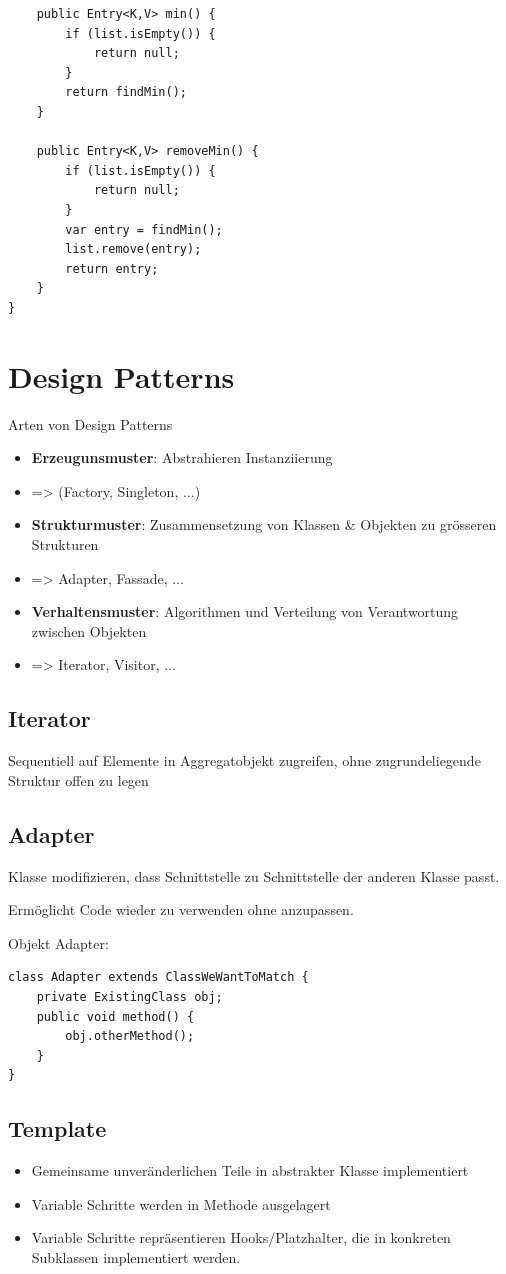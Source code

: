 \begin{multicols*}{4}
	
	\columnbreak
	
	\begin{lstlisting}
	public Entry<K,V> min() {
		if (list.isEmpty()) {
			return null;
		}
		return findMin();
	}

	public Entry<K,V> removeMin() {
		if (list.isEmpty()) {
			return null;
		}
		var entry = findMin();
		list.remove(entry);
		return entry;
	}
}
	\end{lstlisting}

\section{Design Patterns}
	Arten von Design Patterns
	\begin{itemize}
		\item \textbf{Erzeugunsmuster}: Abstrahieren Instanziierung 
		\item => (Factory, Singleton, ...)
		\item \textbf{Strukturmuster}: Zusammensetzung von Klassen \& Objekten zu grösseren Strukturen
		\item => Adapter, Fassade, ...
		\item \textbf{Verhaltensmuster}: Algorithmen und Verteilung von Verantwortung zwischen Objekten
		\item => Iterator, Visitor, ...
	\end{itemize}
	\subsection{Iterator}
	Sequentiell auf Elemente in Aggregatobjekt zugreifen, ohne zugrundeliegende Struktur offen zu legen
	
	\subsection{Adapter}
	Klasse modifizieren, dass Schnittstelle zu Schnittstelle der anderen Klasse passt.
	
	Ermöglicht Code wieder zu verwenden ohne anzupassen.
	
	Objekt Adapter:
	\begin{lstlisting}
class Adapter extends ClassWeWantToMatch {
	private ExistingClass obj;
	public void method() {
		obj.otherMethod();
	}
}
	\end{lstlisting}

	\subsection{Template}
	\begin{itemize}
		\item Gemeinsame unveränderlichen Teile in abstrakter Klasse implementiert
		\item Variable Schritte werden in Methode ausgelagert
		\item Variable Schritte repräsentieren Hooks/Platzhalter, die in konkreten Subklassen implementiert werden.
	\end{itemize}


\end{multicols*}
